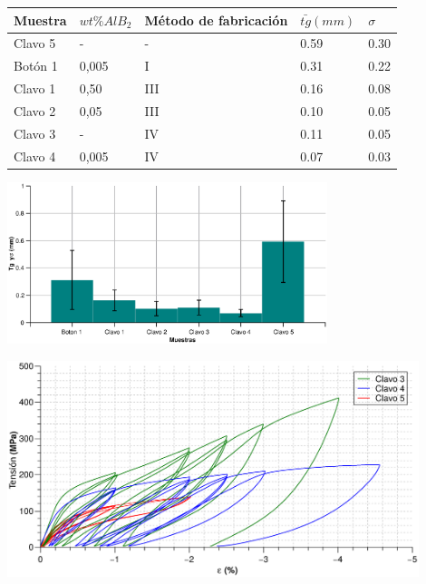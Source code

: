 \documentclass[usenames,dvipsnames]{beamer}
\begin{document}
\begin{frame}
 
 
 
\begin{table} 
\tiny
\begin{center} 
\begin{tabular}{@{}lllll@{}} \toprule
Muestra & $wt \% AlB_2$ & Método de fabricación & $\bar{tg} (mm)$ & $\sigma$ \\ \midrule
 Clavo 5 &  -     & -   & 0.59  & 0.30   \\
 Botón 1    &  0,005 & I   & 0.31 & 0.22  \\
 Clavo 1 &  0,50   & III & 0.16 & 0.08   \\
 Clavo 2 &  0,05  & III & 0.10 & 0.05   \\
 Clavo 3 &  -     & IV  & 0.11 & 0.05   \\
 Clavo 4 &  0,005 & IV  & 0.07 & 0.03   \\
\bottomrule
\end{tabular}
\end{center}
\end{table}
\begin{center}
\includegraphics[width=0.7\textwidth]{img/tamgrano/TamGranos.eps}
\end{center}

\end{frame}

\begin{frame}
 \begin{center}
\includegraphics[width=0.9\textwidth]{img/tamgrano/Clavos_3_4_5.eps}
\end{center}

\end{frame}
\end{document}
